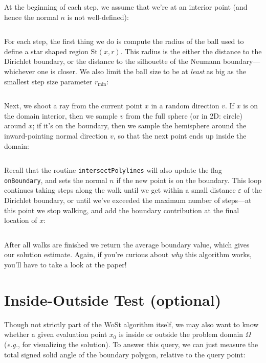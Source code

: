 \documentclass{article}
\newcommand{\code}[1]{\texttt{\small{#1}}}
\newcommand{\eg}{\emph{e.g.}} %
\newcommand{\St}{\text{St}}
\renewcommand{\vec}[1]{#1}
\begin{document}
At the beginning of each step, we assume that we're at an interior point (and hence the normal \(n\) is not well-defined):

\inputminted[fontsize=\small,linenos,firstline=128,lastline=132,bgcolor=bg]{cpp}{../code/WoStLaplace2D.cpp}

For each step, the first thing we do is compute the radius of the ball used to define a star shaped region \(\St(\vec{x},r)\).  This radius is the either the distance to the Dirichlet boundary, or the distance to the silhouette of the Neumann boundary---whichever one is closer.  We also limit the ball size to be at \emph{least} as big as the smallest step size parameter \(r_{\min}\):

\inputminted[fontsize=\small,linenos,firstline=134,lastline=141,bgcolor=bg]{cpp}{../code/WoStLaplace2D.cpp}

Next, we shoot a ray from the current point \(x\) in a random direction \(v\).  If \(x\) is on the domain interior, then we sample \(v\) from the full sphere (or in 2D: circle) around \(x\); if it's on the boundary, then we sample the hemisphere around the inward-pointing normal direction \(v\), so that the next point ends up inside the domain:

\inputminted[fontsize=\small,linenos,firstline=143,lastline=149,bgcolor=bg]{cpp}{../code/WoStLaplace2D.cpp}

Recall that the routine \code{intersectPolylines} will also update the flag \code{onBoundary}, and sets the normal \(n\) if the new point is on the boundary.  This loop continues taking steps along the walk until we get within a small distance \(\varepsilon\) of the Dirichlet boundary, or until we've exceeded the maximum number of steps---at this point we stop walking, and add the boundary contribution at the final location of \(\vec{x}\):

\inputminted[fontsize=\small,linenos,firstline=151,lastline=159,bgcolor=bg]{cpp}{../code/WoStLaplace2D.cpp}

After all walks are finished we return the average boundary value, which gives our solution estimate.  Again, if you're curious about \emph{why} this algorithm works, you'll have to take a look at the paper!

\section{Inside-Outside Test (optional)}
\label{sec:InsideOutsideTest}

Though not strictly part of the WoSt algorithm itself, we may also want to know whether a given evaluation point \(\vec{x}_0\) is inside or outside the problem domain \(\Omega\) (\eg, for visualizing the solution).  To answer this query, we can just measure the total signed solid angle of the boundary polygon, relative to the query point:
\end{document}
